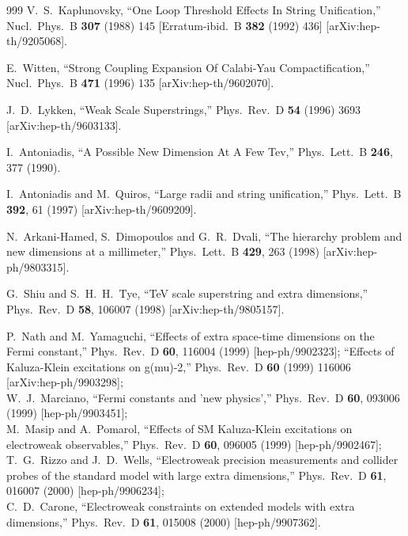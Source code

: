 \begin{thebibliography}{999}
  V.~S.~Kaplunovsky,
  ``One Loop Threshold Effects In String Unification,''
  Nucl.\ Phys.\ B {\bf 307} (1988) 145
  [Erratum-ibid.\ B {\bf 382} (1992) 436]
  [arXiv:hep-th/9205068].

  E.~Witten,
  ``Strong Coupling Expansion Of Calabi-Yau Compactification,''
  Nucl.\ Phys.\ B {\bf 471} (1996) 135
  [arXiv:hep-th/9602070].

  J.~D.~Lykken,
  ``Weak Scale Superstrings,''
  Phys.\ Rev.\ D {\bf 54} (1996) 3693
  [arXiv:hep-th/9603133].

  I.~Antoniadis,
  ``A Possible New Dimension At A Few Tev,''
  Phys.\ Lett.\ B {\bf 246}, 377 (1990).

  I.~Antoniadis and M.~Quiros,
  ``Large radii and string unification,''
  Phys.\ Lett.\ B {\bf 392}, 61 (1997)
  [arXiv:hep-th/9609209].

  N.~Arkani-Hamed, S.~Dimopoulos and G.~R.~Dvali,
  ``The hierarchy problem and new dimensions at a millimeter,''
  Phys.\ Lett.\ B {\bf 429}, 263 (1998)
  [arXiv:hep-ph/9803315].

  G.~Shiu and S.~H.~H.~Tye,
  ``TeV scale superstring and extra dimensions,''
  Phys.\ Rev.\ D {\bf 58}, 106007 (1998)
  [arXiv:hep-th/9805157].

P.~Nath and M.~Yamaguchi,
``Effects of extra space-time dimensions on the Fermi constant,''
Phys.\ Rev.\ D {\bf 60}, 116004 (1999)
[hep-ph/9902323];
  ``Effects of Kaluza-Klein excitations on g(mu)-2,''
  Phys.\ Rev.\ D {\bf 60} (1999) 116006
  [arXiv:hep-ph/9903298];\\
W.~J.~Marciano,
``Fermi constants and 'new physics',''
Phys.\ Rev.\ D {\bf 60}, 093006 (1999)
[hep-ph/9903451];\\
M.~Masip and A.~Pomarol,
``Effects of SM Kaluza-Klein excitations on electroweak observables,''
Phys.\ Rev.\ D {\bf 60}, 096005 (1999)
[hep-ph/9902467];\\
T.~G.~Rizzo and J.~D.~Wells,
``Electroweak precision measurements and collider probes of the standard  model with large extra dimensions,''
Phys.\ Rev.\ D {\bf 61}, 016007 (2000)
[hep-ph/9906234];\\
C.~D.~Carone,
``Electroweak constraints on extended models with extra dimensions,''
Phys.\ Rev.\ D {\bf 61}, 015008 (2000)
[hep-ph/9907362].


\end{thebibliography}
